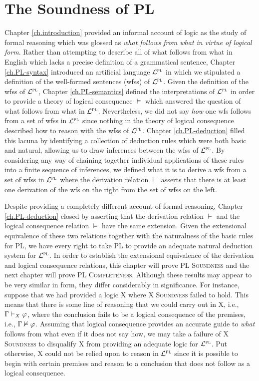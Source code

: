 ﻿%
\chapter{The Soundness of PL}
  \label{ch.PL-Soundness}

Chapter \ref{ch.introduction} provided an informal account of logic as the study of formal reasoning which was glossed as \textit{what follows from what in virtue of logical form}.
Rather than attempting to describe all of what follows from what in English which lacks a precise definition of a grammatical sentence, Chapter \ref{ch.PL-syntax} introduced an artificial language $\mathcal{L}^{\textsc{pl}}$ in which we stipulated a definition of the well-formed sentences (wfss) of $\mathcal{L}^{\textsc{pl}}$.
Given the definition of the wfss of $\mathcal{L}^{\textsc{pl}}$, Chapter \ref{ch.PL-semantics} defined the interpretations of $\mathcal{L}^{\textsc{pl}}$ in order to provide a theory of logical consequence $\vDash$ which answered the question of what follows from what in $\mathcal{L}^{\textsc{pl}}$. 
Nevertheless, we did not say \textit{how} one wfs follows from a set of wfss in $\mathcal{L}^{\textsc{pl}}$ since nothing in the theory of logical consequence described how to reason with the wfss of $\mathcal{L}^{\textsc{pl}}$.
Chapter \ref{ch.PL-deduction} filled this lacuna by identifying a collection of deduction rules which were both basic and natural, allowing us to draw inferences between the wfss of $\mathcal{L}^{\textsc{pl}}$. 
By considering any way of chaining together individual applications of these rules into a finite sequence of inferences, we defined what it is to derive a wfs from a set of wfss in $\mathcal{L}^{\textsc{pl}}$ where the derivation relation $\vdash$ asserts that there is at least one derivation of the wfs on the right from the set of wfss on the left.

Despite providing a completely different account of formal reasoning, Chapter \ref{ch.PL-deduction} closed by asserting that the derivation relation $\vdash$ and the logical consequence relation $\vDash$ have the same extension.  
Given the extensional equivalence of these two relations together with the naturalness of the basic rules for PL, we have every right to take PL to provide an adequate natural deduction system for $\mathcal{L}^{\textsc{pl}}$. %
In order to establish the extensional equivalence of the derivation and logical consequence relations, this chapter will prove \textsc{PL Soundness} and the next chapter will prove \textsc{PL Completeness}.
Although these results may appear to be very similar in form, they differ considerably in significance.
For instance, suppose that we had provided a logic X where \textsc{X Soundness} failed to hold. %
This means that there is some line of reasoning that we could carry out in X, i.e., $\Gamma \vdash_X \varphi$, where the conclusion fails to be a logical consequence of the premises, i.e., $\Gamma \nvDash \varphi$.
Assuming that logical consequence provides an accurate guide to \textit{what} follows from what even if it does not say how, we may take a failure of \textsc{X Soundness} to disqualify X from providing an adequate logic for $\mathcal{L}^{\textsc{pl}}$.
Put otherwise, X could not be relied upon to reason in $\mathcal{L}^{\textsc{pl}}$ since it is possible to begin with certain premises and reason to a conclusion that does not follow as a logical consequence.


